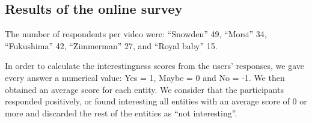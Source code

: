 \documentclass{llncs}
\begin{document}
\subsection{Results of the online survey}
The number of respondents per video were: “Snowden” 49, “Morsi” 34, “Fukushima” 42, “Zimmerman” 27, and “Royal baby” 15.

In order to calculate the interestingness scores from the users’ responses, we gave every answer a numerical value: Yes = 1, Maybe = 0 and No = -1.  We then obtained an average score for each entity.  We consider that the participants responded positively, or found interesting all entities with an average score of 0 or more and discarded the rest of the entities as “not interesting”.


\label{sec:settingUp}

\end{document}

